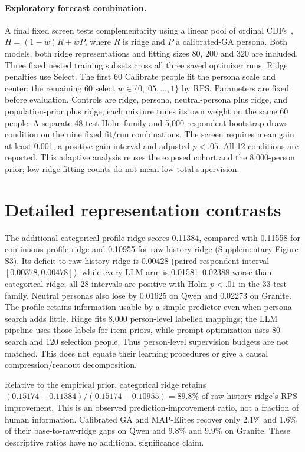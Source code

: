 \documentclass[10pt,twocolumn]{article}
\begin{document}
\paragraph{Exploratory forecast combination.}
A final fixed screen tests complementarity using a linear pool of ordinal
CDFs~\cite{gneiting2011combining}, $H=(1-w)R+wP$, where $R$ is ridge and $P$
a calibrated-GA persona. Both models, both ridge representations and fitting
sizes 80, 200 and 320 are included. Three fixed nested training subsets cross
all three saved optimizer runs. Ridge penalties use Select. The first 60
Calibrate people fit the persona scale and center; the remaining 60 select
$w\in\{0,.05,\ldots,1\}$ by RPS. Parameters are fixed before evaluation.
Controls are ridge, persona, neutral-persona plus ridge, and population-prior
plus ridge; each mixture tunes its own weight on the same 60 people.
A separate 48-test Holm family and 5,000 respondent-bootstrap draws condition
on the nine fixed fit/run combinations. The screen requires mean gain at least
0.001, a positive gain interval and adjusted $p<.05$. All 12 conditions are
reported. This adaptive analysis reuses the exposed cohort and the 8,000-person
prior; low ridge fitting counts do not mean low total supervision.


\section{Detailed representation contrasts}
The additional categorical-profile ridge scores 0.11384, compared with
0.11558 for continuous-profile ridge and 0.10955 for raw-history ridge
(Supplementary Figure S3). Its deficit to raw-history ridge is
0.00428 (paired respondent interval $[0.00378,0.00478]$), while every LLM
arm is 0.01581--0.02388 worse than categorical ridge; all 28 intervals are
positive with Holm $p<.01$ in the 33-test family. Neutral personas also lose
by 0.01625 on Qwen and 0.02273 on Granite. The profile retains information
usable by a simple predictor even when persona search adds little. Ridge fits
8,000 person-level labelled mappings; the LLM pipeline uses those labels for
item priors, while prompt optimization uses 80 search and 120 selection people.
Thus person-level supervision budgets are not matched. This does
not equate their learning procedures or give a causal compression/readout
decomposition.

Relative to the empirical prior, categorical ridge retains
$(0.15174-0.11384)/(0.15174-0.10955)=89.8\%$ of raw-history ridge's
RPS improvement. This is an observed prediction-improvement ratio, not a
fraction of human information. Calibrated GA and MAP-Elites recover only
2.1\% and 1.6\% of their base-to-raw-ridge gaps on Qwen and 9.8\% and
9.9\% on Granite. These descriptive ratios have no additional significance claim.




\end{document}
